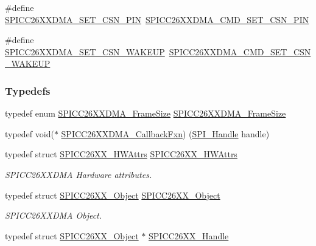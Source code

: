 \begin{DoxyCompactItemize}
\item 
\#define \hyperlink{_s_p_i_c_c26_x_x_d_m_a_8h_a447172f0061a6de65a8f0d221a23f93c}{S\+P\+I\+C\+C26\+X\+X\+D\+M\+A\+\_\+\+S\+E\+T\+\_\+\+C\+S\+N\+\_\+\+P\+I\+N}~\hyperlink{_s_p_i_c_c26_x_x_d_m_a_8h_ab3ab03abd9ca073344acdcc6b442f9eb}{S\+P\+I\+C\+C26\+X\+X\+D\+M\+A\+\_\+\+C\+M\+D\+\_\+\+S\+E\+T\+\_\+\+C\+S\+N\+\_\+\+P\+I\+N}
\item 
\#define \hyperlink{_s_p_i_c_c26_x_x_d_m_a_8h_a55b298e59379bdd6020f8d55bb4264a9}{S\+P\+I\+C\+C26\+X\+X\+D\+M\+A\+\_\+\+S\+E\+T\+\_\+\+C\+S\+N\+\_\+\+W\+A\+K\+E\+U\+P}~\hyperlink{_s_p_i_c_c26_x_x_d_m_a_8h_ae07fd93964e63fc93795835eaa14b589}{S\+P\+I\+C\+C26\+X\+X\+D\+M\+A\+\_\+\+C\+M\+D\+\_\+\+S\+E\+T\+\_\+\+C\+S\+N\+\_\+\+W\+A\+K\+E\+U\+P}
\end{DoxyCompactItemize}
\subsubsection*{Typedefs}
\begin{DoxyCompactItemize}
\item 
typedef enum \hyperlink{_s_p_i_c_c26_x_x_d_m_a_8h_a1c5afb8465d3e8689a82088ad25fc81a}{S\+P\+I\+C\+C26\+X\+X\+D\+M\+A\+\_\+\+Frame\+Size} \hyperlink{_s_p_i_c_c26_x_x_d_m_a_8h_aa9aa99fc2a0c94cd7aa263ba08eafb92}{S\+P\+I\+C\+C26\+X\+X\+D\+M\+A\+\_\+\+Frame\+Size}
\item 
typedef void($\ast$ \hyperlink{_s_p_i_c_c26_x_x_d_m_a_8h_aee214140ae2ad978d6d755f12a84f331}{S\+P\+I\+C\+C26\+X\+X\+D\+M\+A\+\_\+\+Callback\+Fxn}) (\hyperlink{_s_p_i_8h_a728806534c3c3e8675cfbfb7d8e36f13}{S\+P\+I\+\_\+\+Handle} handle)
\item 
typedef struct \hyperlink{struct_s_p_i_c_c26_x_x___h_w_attrs}{S\+P\+I\+C\+C26\+X\+X\+\_\+\+H\+W\+Attrs} \hyperlink{_s_p_i_c_c26_x_x_d_m_a_8h_a21a908cc990ffbb1378d92a68c09ac2a}{S\+P\+I\+C\+C26\+X\+X\+\_\+\+H\+W\+Attrs}
\begin{DoxyCompactList}\small\item\em S\+P\+I\+C\+C26\+X\+X\+D\+M\+A Hardware attributes. \end{DoxyCompactList}\item 
typedef struct \hyperlink{struct_s_p_i_c_c26_x_x___object}{S\+P\+I\+C\+C26\+X\+X\+\_\+\+Object} \hyperlink{_s_p_i_c_c26_x_x_d_m_a_8h_a4e4c18a99d7f9d331ed9d2f21975e8c2}{S\+P\+I\+C\+C26\+X\+X\+\_\+\+Object}
\begin{DoxyCompactList}\small\item\em S\+P\+I\+C\+C26\+X\+X\+D\+M\+A Object. \end{DoxyCompactList}\item 
typedef struct \hyperlink{struct_s_p_i_c_c26_x_x___object}{S\+P\+I\+C\+C26\+X\+X\+\_\+\+Object} $\ast$ \hyperlink{_s_p_i_c_c26_x_x_d_m_a_8h_a4da256c4dcd9175655207a9508358b6c}{S\+P\+I\+C\+C26\+X\+X\+\_\+\+Handle}
\end{DoxyCompactItemize}

